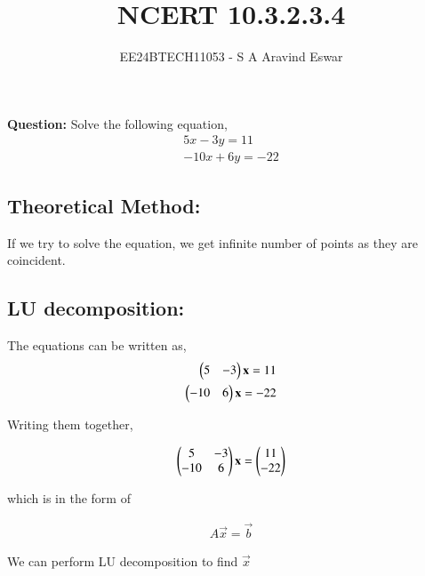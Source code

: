 \documentclass[journal]{IEEEtran}
\begin{document}

\vspace{3cm}

\title{NCERT 10.3.2.3.4}
\author{EE24BTECH11053 - S A Aravind Eswar}
{\let\newpage\relax\maketitle}

\renewcommand{\thefigure}{\theenumi}
\renewcommand{\thetable}{\theenumi}
\setlength{\intextsep}{10pt} %

\textbf{Question: } Solve the following equation,
\begin{align}
    5x - 3y = 11\\
    -10x + 6y = -22
\end{align}

\subsection{Theoretical Method:}

If we try to solve the equation, we get infinite number of points as they are coincident.

\subsection{LU decomposition:}

The equations can be written as,
\begin{align}
    \begin{pmatrix}5 & -3\end{pmatrix}\mathbf{x} = 11\\
    \begin{pmatrix}-10 & 6\end{pmatrix}\mathbf{x} = -22
\end{align}

Writing them together,

\begin{align}
    \begin{pmatrix}5 & -3\\-10 & 6\end{pmatrix}\mathbf{x} = \begin{pmatrix}11\\-22\end{pmatrix}
\end{align}

which is in the form of

\begin{align}
    A\vec{x} = \vec{b}
\end{align}

We can perform LU decomposition to  find $\vec{x}$
\end{document}
